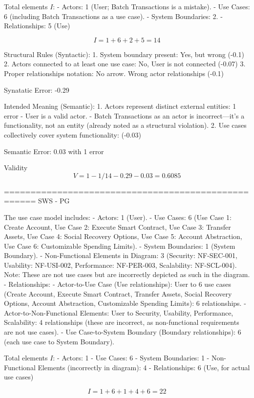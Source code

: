 Total elements \( I \):
- Actors: 1 (User; Batch Transactions is a mistake).
- Use Cases: 6 (including Batch Transactions as a use case).
- System Boundaries: 2.
- Relationships: 5 (Use) 

\[
I = 1 + 6 + 2 + 5 = 14
\]

Structural Rules (Syntactic):
1. System boundary present: Yes, but wrong (-0.1)
2. Actors connected to at least one use case: No, User is not connected (-0.07)
3. Proper relationships notation: No arrow. Wrong actor relationships (-0.1)

Synatatic Error: -0.29

Intended Meaning (Semantic):
1. Actors represent distinct external entities: 1 error
- User is a valid actor.
- Batch Transactions as an actor is incorrect—it’s a functionality, not an entity (already noted as a structural violation).
2. Use cases collectively cover system functionality: (-0.03)

Semantic Error: 0.03 with 1 error

Validity
\[
V = 1 - 1/14- 0.29 - 0.03 = 0.6085
\]

====================================================
SWS - PG

The use case model includes:
- Actors: 1 (User).
- Use Cases: 6 (Use Case 1: Create Account, Use Case 2: Execute Smart Contract, Use Case 3: Transfer Assets, Use Case 4: Social Recovery Options, Use Case 5: Account Abstraction, Use Case 6: Customizable Spending Limits).
- System Boundaries: 1 (System Boundary).
- Non-Functional Elements in Diagram: 3 (Security: NF-SEC-001, Usability: NF-USI-002, Performance: NF-PER-003, Scalability: NF-SCL-004). Note: These are not use cases but are incorrectly depicted as such in the diagram.
- Relationships:
- Actor-to-Use Case (Use relationships): User to 6 use cases (Create Account, Execute Smart Contract, Transfer Assets, Social Recovery Options, Account Abstraction, Customizable Spending Limits): 6 relationships.
- Actor-to-Non-Functional Elements: User to Security, Usability, Performance, Scalability: 4 relationships (these are incorrect, as non-functional requirements are not use cases).
- Use Case-to-System Boundary (Boundary relationships): 6 (each use case to System Boundary).

Total elements \( I \):
- Actors: 1
- Use Cases: 6
- System Boundaries: 1
- Non-Functional Elements (incorrectly in diagram): 4
- Relationships: 6 (Use, for actual use cases)

\[
I = 1 + 6 + 1 + 4 + 6 = 22
\]

